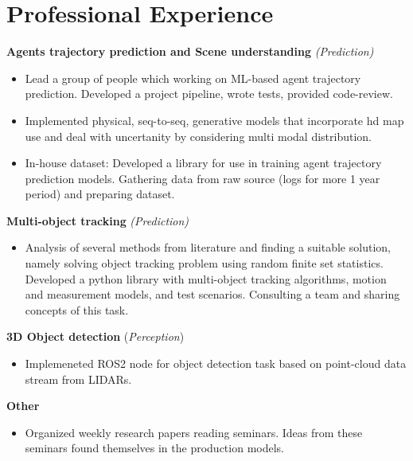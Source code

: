 \section*{\sectionformat Professional Experience}
% 

\textbf{Agents trajectory prediction and Scene understanding} \textit{(Prediction)}
\begin{itemize}
    \item Lead a group of people which working on ML-based agent trajectory prediction. Developed a project pipeline, wrote tests, provided code-review.
    \item Implemented physical, seq-to-seq, generative models that incorporate hd map use and deal with uncertanity by considering multi modal distribution.
    \item In-house dataset: Developed a library for use in training agent trajectory prediction models. Gathering data from raw source (logs for more 1 year period) and preparing dataset.
\end{itemize}

\textbf{Multi-object tracking} \textit{(Prediction)}
\begin{itemize}
    \item Analysis of several methods from literature and finding a suitable solution, namely solving object tracking problem using random finite set statistics. Developed a python library with multi-object tracking algorithms, motion and measurement models, and test scenarios. Consulting a team and sharing concepts of this task.
\end{itemize}

\textbf{3D Object detection} (\textit{Perception})
\begin{itemize}
    \item Implemeneted ROS2 node for object detection task based on point-cloud data stream from LIDARs.
\end{itemize}

\textbf{Other}
\begin{itemize}
    \item Organized weekly research papers reading seminars. Ideas from these seminars found themselves in the production models.
\end{itemize}

